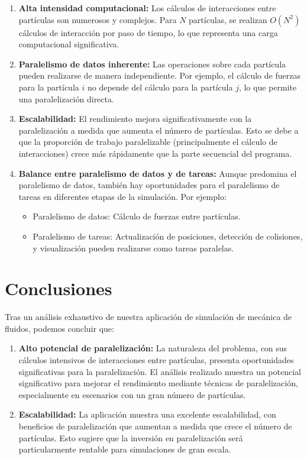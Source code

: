 \documentclass[12pt,a4paper]{article}
\begin{document}
	\begin{enumerate}
		\item \textbf{Alta intensidad computacional:} Los cálculos de interacciones entre partículas son numerosos y complejos. Para $N$ partículas, se realizan $O(N^2)$ cálculos de interacción por paso de tiempo, lo que representa una carga computacional significativa.
		
		\item \textbf{Paralelismo de datos inherente:} Las operaciones sobre cada partícula pueden realizarse de manera independiente. Por ejemplo, el cálculo de fuerzas para la partícula $i$ no depende del cálculo para la partícula $j$, lo que permite una paralelización directa.
		
		\item \textbf{Escalabilidad:} El rendimiento mejora significativamente con la paralelización a medida que aumenta el número de partículas. Esto se debe a que la proporción de trabajo paralelizable (principalmente el cálculo de interacciones) crece más rápidamente que la parte secuencial del programa.
		
		\item \textbf{Balance entre paralelismo de datos y de tareas:} Aunque predomina el paralelismo de datos, también hay oportunidades para el paralelismo de tareas en diferentes etapas de la simulación. Por ejemplo:
		\begin{itemize}
			\item Paralelismo de datos: Cálculo de fuerzas entre partículas.
			\item Paralelismo de tareas: Actualización de posiciones, detección de colisiones, y visualización pueden realizarse como tareas paralelas.
		\end{itemize}
		
	\end{enumerate}
	
	
	\newpage
	

	
	
	\section{Conclusiones}
	Tras un análisis exhaustivo de nuestra aplicación de simulación de mecánica de fluidos, podemos concluir que:
	
	\begin{enumerate}
		\item \textbf{Alto potencial de paralelización:} La naturaleza del problema, con sus cálculos intensivos de interacciones entre partículas, presenta oportunidades significativas para la paralelización. El análisis realizado muestra un potencial significativo para mejorar el rendimiento mediante técnicas de paralelización, especialmente en escenarios con un gran número de partículas.
		
		\item \textbf{Escalabilidad:} La aplicación muestra una excelente escalabilidad, con beneficios de paralelización que aumentan a medida que crece el número de partículas. Esto sugiere que la inversión en paralelización será particularmente rentable para simulaciones de gran escala.
		
	\end{enumerate}
	
\end{document}
